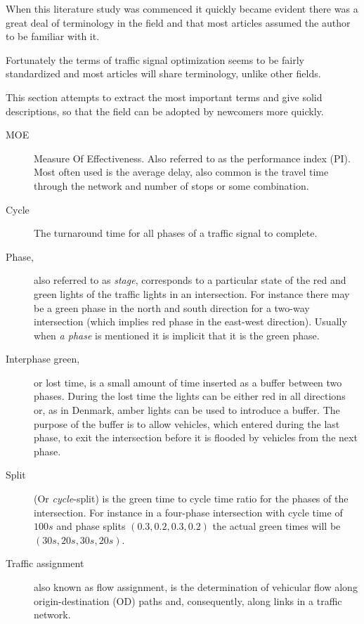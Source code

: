 \label{vocabulary}
When this literature study was commenced it quickly became evident there was a great deal of terminology in the field and that most articles assumed the author to be familiar with it. 

Fortunately the terms of traffic signal optimization seems to be fairly standardized and most articles will share terminology, unlike other fields.

This section attempts to extract the most important terms and give solid descriptions, so that the field can be adopted by newcomers more quickly.

\begin{description}

	\item[MOE] Measure Of Effectiveness. Also referred to as the performance index (PI).
	Most often used is the average delay, also common is the travel time through the network and number of stops or some combination.
			
	\item[Cycle] The turnaround time for all phases of a traffic signal to complete.
	
	\item[Phase,] also referred to as \textit{stage}, corresponds to a particular state of the red and green lights of the traffic lights in an intersection. 
	For instance there may be a green phase in the north and south direction for a two-way intersection (which implies red phase in the east-west direction). Usually when \textit{a phase} is mentioned it is implicit that it is the green phase.

\item[Interphase green,] or lost time, is a small amount of time inserted as a buffer between two phases. During the lost time the lights can be either red in all directions or, as in Denmark, amber lights can be used to introduce a buffer. The purpose of the buffer is to allow vehicles, which entered during the last phase, to exit the intersection before it is flooded by vehicles from the next phase.
	
	\item[Split] (Or \textit{cycle}-split) is the green time to cycle time ratio for the phases of the intersection. For instance in a four-phase intersection with cycle time of $100s$ and phase splits $\left( 0.3, 0.2, 0.3, 0.2 \right)$ the actual green times will be $\left( 30s, 20s, 30s, 20s \right)$. 
	
	\item[Traffic assignment] also known as flow assignment, is the determination of vehicular flow along origin-destination (OD) paths and, consequently, along links in a traffic network. 


\end{description}
